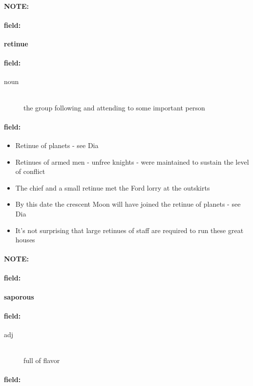 \documentclass[12pt]{article}
\newenvironment{note}{\paragraph{NOTE:}}{}
\newenvironment{field}{\paragraph{field:}}{}
\begin{document}
\begin{note}
\begin{field}
\textbf{\large retinue}
\end{field}


\begin{field}
\begin{description}
\item[noun] \hfill \\ 
the group following and attending to some important person

\end{description}
\end{field}

\begin{field}
\begin{itemize}
\item Retinue of planets - see Dia
\item Retinues of armed men - unfree knights - were maintained to sustain the level of conflict
\item The chief and a small retinue met the Ford lorry at the outskirts
\item By this date the crescent Moon will have joined the retinue of planets - see Dia
\item It's not surprising that large retinues of staff are required to run these great houses
\end{itemize}
\end{field}
\end{note}
\begin{note}
\begin{field}
\textbf{\large saporous}
\end{field}


\begin{field}
\begin{description}
\item[adj] \hfill \\ 
full of flavor

\end{description}
\end{field}

\begin{field}
\end{field}
\end{note}
\end{document}
